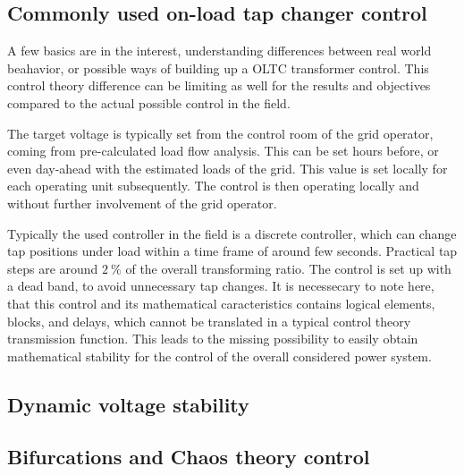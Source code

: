 \subsection{Commonly used on-load tap changer control}

A few basics are in the interest, understanding differences between real world beahavior, or possible ways of building up a \acs{OLTC} transformer control. This control theory difference can be limiting as well for the results and objectives compared to the actual possible control in the field.

The target voltage is typically set from the control room of the grid operator, coming from pre-calculated load flow analysis. This can be set hours before, or even day-ahead with the estimated loads of the grid. This value is set locally for each operating unit subsequently. The control is then operating locally and without further involvement of the grid operator. \quelle

Typically the used controller in the field is a discrete controller, which can change tap positions under load within a time frame of around few seconds. Practical tap steps are around $2~\mathrm{\%}$ of the overall transforming ratio. The control is set up with a dead band, to avoid unnecessary tap changes. It is necessecary to note here, that this control and its mathematical caracteristics contains logical elements, blocks, and delays, which cannot be translated in a typical control theory transmission function. This leads to the missing possibility to easily obtain mathematical stability for the control of the overall considered power system. \quelle

\subsection{Dynamic voltage stability}


\subsection{Bifurcations and Chaos theory control}


